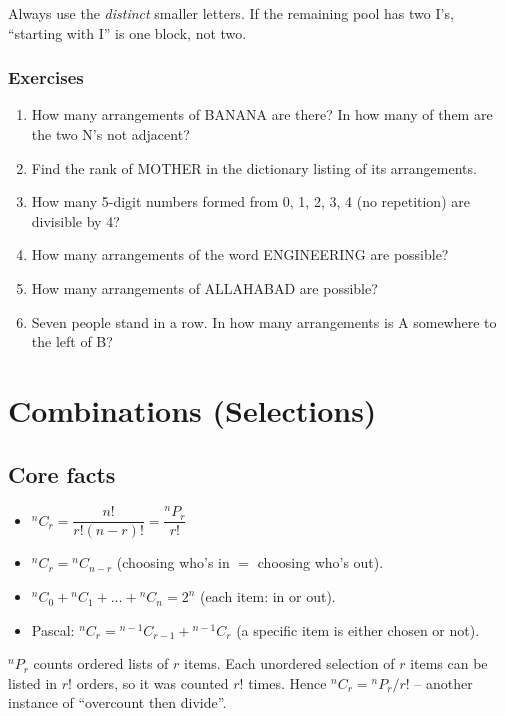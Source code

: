 \documentclass[11pt,a4paper,openany]{report}
\newenvironment{exercises}{\subsection*{Exercises \thechapter}\begin{enumerate}[label=\textbf{\thechapter.\arabic*},leftmargin=3.2em]}{\end{enumerate}}
\begin{document}
\begin{shortcut}
Always use the \emph{distinct} smaller letters. If the remaining pool has two I's, ``starting with I''
is one block, not two.
\end{shortcut}

\begin{exercises}
\item How many arrangements of BANANA are there? In how many of them are the two N's not adjacent?
\item Find the rank of MOTHER in the dictionary listing of its arrangements.
\item How many 5-digit numbers formed from 0, 1, 2, 3, 4 (no repetition) are divisible by 4?
\item How many arrangements of the word ENGINEERING are possible?
\item How many arrangements of ALLAHABAD are possible?
\item Seven people stand in a row. In how many arrangements is A somewhere to the left of B?
\end{exercises}

\chapter{Combinations (Selections)}\label{ch:comb}

\section{Core facts}
\begin{itemize}
\item $^nC_r=\dfrac{n!}{r!(n-r)!}=\dfrac{^nP_r}{r!}$
\item $^nC_r={}^nC_{n-r}$ (choosing who's in $=$ choosing who's out).
\item $^nC_0+{}^nC_1+\dots+{}^nC_n=2^n$ (each item: in or out).
\item Pascal: $^nC_r={}^{n-1}C_{r-1}+{}^{n-1}C_r$ (a specific item is either chosen or not).
\end{itemize}

\begin{why}
$^nP_r$ counts ordered lists of $r$ items. Each unordered selection of $r$ items can be listed in
$r!$ orders, so it was counted $r!$ times. Hence $^nC_r={}^nP_r/r!$ -- another instance of
``overcount then divide''.
\end{why}
\end{document}
